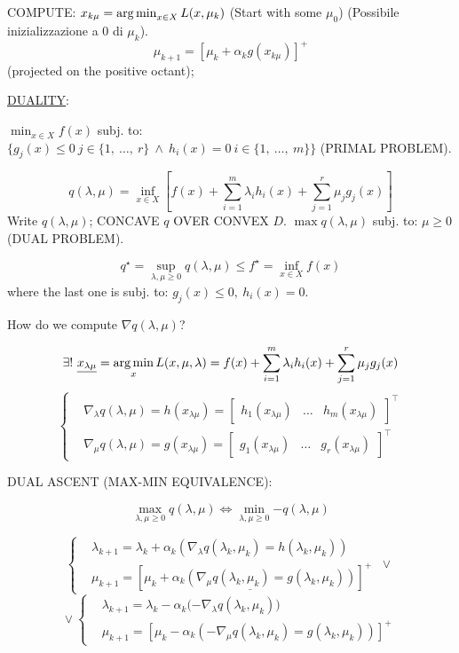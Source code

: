 COMPUTE: $x_{k\mu} = \operatorname*{arg\,min}_{x\in X}{L(x,\mu_k)}$ (Start with some $\mu_0$) (Possibile inizializzazione a 0 di $\mu_k$).
\[
	\mu_{k+1} = [\mu_k + \alpha_kg(x_{k\mu})]^+
\]
(projected on the positive octant);

\underline{DUALITY}:

$\min_{x\in X}{f(x)}$ subj. to: $\{g_j(x)\leq 0\ j\in\{1,\ \dots,\ r\}\ \land\ h_i(x)=0\ i\in\{1,\ \dots,\ m\}\}$ (PRIMAL PROBLEM).

\[
	q(\lambda,\mu) = \inf_{x\in X}{[f(x) + \sum_{i=1}^m{\lambda_ih_i(x)} + \sum_{j=1}^r{\mu_jg_j(x)}]}
\]
Write $q(\lambda,\mu)$; CONCAVE $q$ OVER CONVEX $D$.
$\max{q(\lambda,\mu)}$ subj. to: $\mu\geq 0$ (DUAL PROBLEM).

\[
	q^\star = \sup_{\lambda,\mu\geq 0}{q(\lambda,\mu)} \leq f^\star = \inf_{x\in X}{f(x)}
\]
where the last one is subj. to: $g_j(x)\leq 0,\ h_i(x)=0$.

How do we compute $\nabla{q(\lambda,\mu)}$?

\[
	\exists!\ \underline{x_{\lambda\mu}} = \operatorname*{arg\,min}_x{L(x,\mu,\lambda) = f(x) + \sum_{i=1}^m{\lambda_ih_i(x)} + \sum_{j=1}^r{\mu_jg_j(x)}}
\]
\[
	\left\{
	\begin{aligned}
	&\nabla_\lambda{q(\lambda,\mu)} = h(x_{\lambda\mu}) = \begin{bmatrix}h_1(x_{\lambda\mu})&\dots&h_m(x_{\lambda\mu})\end{bmatrix}^\top\\
	&\nabla_\mu{q(\lambda,\mu)} = g(x_{\lambda\mu}) = \begin{bmatrix}g_1(x_{\lambda\mu})&\dots&g_r(x_{\lambda\mu})\end{bmatrix}^\top
	\end{aligned}
	\right.
\]	 

DUAL ASCENT (MAX-MIN EQUIVALENCE):

\[
	\max_{\lambda,\mu\geq 0}{q(\lambda,\mu)} \iff \min_{\lambda,\mu\geq 0}{-q(\lambda,\mu)}
\]

\[	
	\left\{
	\begin{aligned}
	&\lambda_{k+1} = \lambda_k + \alpha_k(\nabla_\lambda{q(\lambda_k,\mu_k)} = h(\lambda_k,\mu_k))\\
	&\mu_{k+1} = [\underline{\mu_k + \alpha_k(\nabla_\mu{q(\lambda_k,\mu_k)} = g(\lambda_k,\mu_k))}]^+
	\end{aligned}
	\right.\ \lor\ 
\]
\[
	\lor\ 
	\left\{
	\begin{aligned}
	&\lambda_{k+1} = \lambda_k - \alpha_k(-\nabla_\lambda{q(\lambda_k,\mu_k))}\\
	&\mu_{k+1} = [\mu_k - \alpha_k(-\nabla_\mu{q(\lambda_k,\mu_k)} = g(\lambda_k,\mu_k))]^+
	\end{aligned}
	\right.
\]

